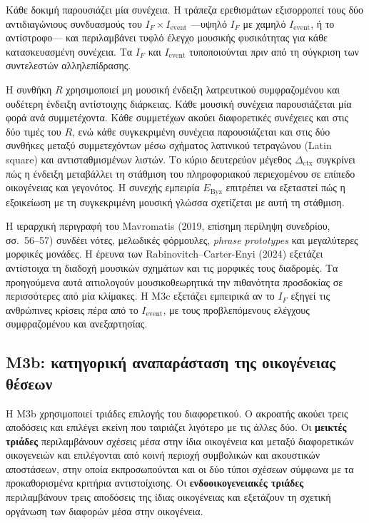 \documentclass[11pt,a4paper]{article}
\begin{document}
Κάθε δοκιμή παρουσιάζει μία συνέχεια. Η τράπεζα ερεθισμάτων εξισορροπεί τους δύο αντιδιαγώνιους συνδυασμούς του $I_F\times I_{\mathrm{event}}$ ---υψηλό $I_F$ με χαμηλό $I_{\mathrm{event}}$, ή το αντίστροφο--- και περιλαμβάνει τυφλό έλεγχο μουσικής φυσικότητας για κάθε κατασκευασμένη συνέχεια. Τα $I_F$ και $I_{\mathrm{event}}$ τυποποιούνται πριν από τη σύγκριση των συντελεστών αλληλεπίδρασης.

Η συνθήκη $R$ χρησιμοποιεί μη μουσική ένδειξη λατρευτικού συμφραζομένου και ουδέτερη ένδειξη αντίστοιχης διάρκειας. Κάθε μουσική συνέχεια παρουσιάζεται μία φορά ανά συμμετέχοντα. Κάθε συμμετέχων ακούει διαφορετικές συνέχειες και στις δύο τιμές του $R$, ενώ κάθε συγκεκριμένη συνέχεια παρουσιάζεται και στις δύο συνθήκες μεταξύ συμμετεχόντων μέσω σχήματος λατινικού τετραγώνου (Latin square) και αντισταθμισμένων λιστών. Το κύριο δευτερεύον μέγεθος $\Delta_{\mathrm{ctx}}$ συγκρίνει πώς η ένδειξη μεταβάλλει τη στάθμιση του πληροφοριακού περιεχομένου σε επίπεδο οικογένειας και γεγονότος. Η συνεχής εμπειρία $E_{\mathrm{Byz}}$ επιτρέπει να εξεταστεί πώς η εξοικείωση με τη συγκεκριμένη μουσική γλώσσα σχετίζεται με αυτή τη στάθμιση.

Η ιεραρχική περιγραφή του Mavromatis (2019, επίσημη περίληψη συνεδρίου, σσ.~56--57) συνδέει νότες, μελωδικές φόρμουλες, \emph{phrase prototypes} και μεγαλύτερες μορφικές μονάδες. Η έρευνα των Rabinovitch--Carter-Enyi (2024) εξετάζει αντίστοιχα τη διαδοχή μουσικών σχημάτων και τις μορφικές τους διαδρομές. Τα προηγούμενα αυτά αιτιολογούν μουσικοθεωρητικά την πιθανότητα προσδοκίας σε περισσότερες από μία κλίμακες. Η M3c εξετάζει εμπειρικά αν το $I_F$ εξηγεί τις ανθρώπινες κρίσεις πέρα από το $I_{\mathrm{event}}$, με τους προβλεπόμενους ελέγχους συμφραζομένου και ανεξαρτησίας.

\subsection{M3b: κατηγορική αναπαράσταση της οικογένειας θέσεων}\label{sec:m3b}

Η M3b χρησιμοποιεί τριάδες επιλογής του διαφορετικού. Ο ακροατής ακούει τρεις αποδόσεις και επιλέγει εκείνη που ταιριάζει λιγότερο με τις άλλες δύο. Οι \textbf{μεικτές τριάδες} περιλαμβάνουν σχέσεις μέσα στην ίδια οικογένεια και μεταξύ διαφορετικών οικογενειών και επιλέγονται από κοινή περιοχή συμβολικών και ακουστικών αποστάσεων, στην οποία εκπροσωπούνται και οι δύο τύποι σχέσεων σύμφωνα με τα προκαθορισμένα κριτήρια αντιστοίχισης. Οι \textbf{ενδοοικογενειακές τριάδες} περιλαμβάνουν τρεις αποδόσεις της ίδιας οικογένειας και εξετάζουν τη σχετική οργάνωση των διαφορών μέσα στην οικογένεια.
\end{document}
